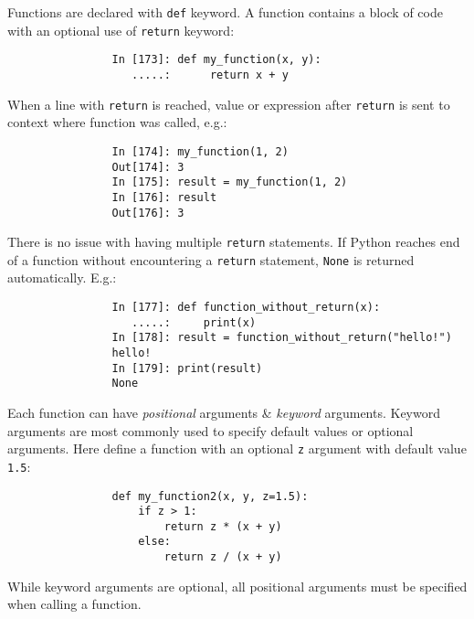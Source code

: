 \documentclass{article}
\begin{document}
\begin{enumerate}
\begin{itemize}
\begin{itemize}
			Functions are declared with {\tt def} keyword. A function contains a block of code with an optional use of {\tt return} keyword:
			\begin{verbatim}
				In [173]: def my_function(x, y):
				   .....:      return x + y
			\end{verbatim}
			When a line with {\tt return} is reached, value or expression after {\tt return} is sent to context where function was called, e.g.:
			\begin{verbatim}
				In [174]: my_function(1, 2)
				Out[174]: 3
				In [175]: result = my_function(1, 2)
				In [176]: result
				Out[176]: 3
			\end{verbatim}
			There is no issue with having multiple {\tt return} statements. If Python reaches end of a function without encountering a {\tt return} statement, {\tt None} is returned automatically. E.g.:
			\begin{verbatim}
				In [177]: def function_without_return(x):
				   .....:     print(x)
				In [178]: result = function_without_return("hello!")
				hello!
				In [179]: print(result)
				None
			\end{verbatim}
			Each function can have {\it positional} arguments \& {\it keyword} arguments. Keyword arguments are most commonly used to specify default values or optional arguments. Here define a function with an optional {\tt z} argument with default value {\tt1.5}:
			\begin{verbatim}
				def my_function2(x, y, z=1.5):
				    if z > 1:
				        return z * (x + y)
				    else:
				        return z / (x + y)
			\end{verbatim}
			While keyword arguments are optional, all positional arguments must be specified when calling a function.
			

\end{itemize}
\end{itemize}
\end{enumerate}
\end{document}
